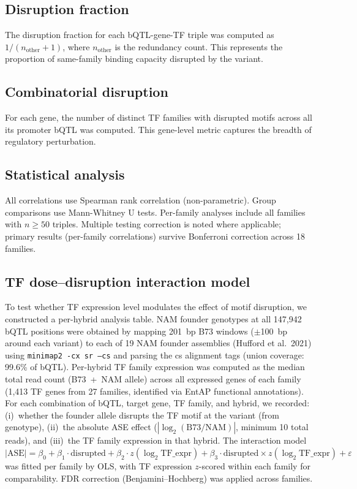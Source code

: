 \documentclass[11pt,a4paper]{article}
\begin{document}
\subsection{Disruption fraction}

The disruption fraction for each bQTL-gene-TF triple was computed as $1 / (n_\text{other} + 1)$, where $n_\text{other}$ is the redundancy count. This represents the proportion of same-family binding capacity disrupted by the variant.

\subsection{Combinatorial disruption}

For each gene, the number of distinct TF families with disrupted motifs across all its promoter bQTL was computed. This gene-level metric captures the breadth of regulatory perturbation.

\subsection{Statistical analysis}

All correlations use Spearman rank correlation (non-parametric). Group comparisons use Mann-Whitney U tests. Per-family analyses include all families with $n \geq 50$ triples. Multiple testing correction is noted where applicable; primary results (per-family correlations) survive Bonferroni correction across 18 families.

\subsection{TF dose--disruption interaction model}

To test whether TF expression level modulates the effect of motif disruption, we constructed a per-hybrid analysis table. NAM founder genotypes at all 147,942 bQTL positions were obtained by mapping 201~bp B73 windows ($\pm$100~bp around each variant) to each of 19 NAM founder assemblies (Hufford et al.\ 2021) using \texttt{minimap2 -cx sr --cs} and parsing the cs alignment tags (union coverage: 99.6\% of bQTL). Per-hybrid TF family expression was computed as the median total read count (B73~+~NAM allele) across all expressed genes of each family (1,413 TF genes from 27 families, identified via EntAP functional annotations). For each combination of bQTL, target gene, TF family, and hybrid, we recorded: (i)~whether the founder allele disrupts the TF motif at the variant (from genotype), (ii)~the absolute ASE effect ($|\log_2(\text{B73/NAM})|$, minimum 10 total reads), and (iii)~the TF family expression in that hybrid. The interaction model $|\text{ASE}| = \beta_0 + \beta_1 \cdot \text{disrupted} + \beta_2 \cdot z(\log_2 \text{TF\_expr}) + \beta_3 \cdot \text{disrupted} \times z(\log_2 \text{TF\_expr}) + \varepsilon$ was fitted per family by OLS, with TF expression $z$-scored within each family for comparability. FDR correction (Benjamini--Hochberg) was applied across families.
\end{document}
